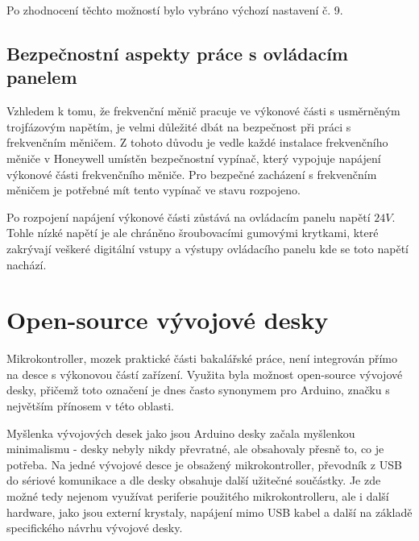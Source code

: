 Po zhodnocení těchto možností bylo vybráno výchozí nastavení č. 9.

\subsection{Bezpečnostní aspekty práce s ovládacím panelem}

Vzhledem k tomu, že frekvenční měnič pracuje ve výkonové části s usměrněným trojfázovým napětím, je velmi důležité dbát na bezpečnost při práci s frekvenčním měničem. Z tohoto důvodu je vedle každé instalace frekvenčního měniče v Honeywell umístěn bezpečnostní vypínač, který vypojuje napájení výkonové části frekvenčního měniče. Pro bezpečné zacházení s frekvenčním měničem je potřebné mít tento vypínač ve stavu rozpojeno.

Po rozpojení napájení výkonové části zůstává na ovládacím panelu napětí $24V$. Tohle nízké napětí je ale chráněno šroubovacími gumovými krytkami, které zakrývají veškeré digitální vstupy a výstupy ovládacího panelu kde se toto napětí nachází.

\section{Open-source vývojové desky}

Mikrokontroller, mozek praktické části bakalářské práce, není integrován přímo na desce s výkonovou částí zařízení. Využita byla možnost open-source vývojové desky, přičemž toto označení je dnes často synonymem pro Arduino, značku s největším přínosem v této oblasti.

Myšlenka vývojových desek jako jsou Arduino desky začala myšlenkou minimalismu - desky nebyly nikdy převratné, ale obsahovaly přesně to, co je potřeba. Na jedné vývojové desce je obsažený mikrokontroller, převodník z USB do sériové komunikace a dle desky obsahuje další užitečné součástky. Je zde možné tedy nejenom využívat periferie použitého mikrokontrolleru, ale i další hardware, jako jsou externí krystaly, napájení mimo USB kabel a další na základě specifického návrhu vývojové desky.
\cite{KnihaOArduinu}

